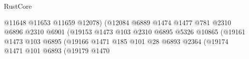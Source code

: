 \begin{lexlean}{RustCore}
\begin{coremodule}
                                                              @11648
                                                              @11653
                                                              @11659
                                                              @12078)
                                                            (@12084
                                                              @6889
                                                              @1474
                                                              @1477
                                                              @781
                                                              @2310
                                                              @6896
                                                              @2310
                                                              @6901
                                                              (@19153
                                                                @1473
                                                                @103
                                                                @2310
                                                                @6895
                                                                @5326
                                                                @10865
                                                                (@19161
                                                                  @1473
                                                                  @103
                                                                  @6895
                                                                  (@19166
                                                                    @1471
                                                                    @185
                                                                    @101
                                                                    @28
                                                                    @6893
                                                                    @2364
                                                                    (@19174
                                                                      @1471
                                                                      @101
                                                                      @6893
                                                                      (@19179
                                                                        @1470

\end{coremodule}
\end{lexlean}
